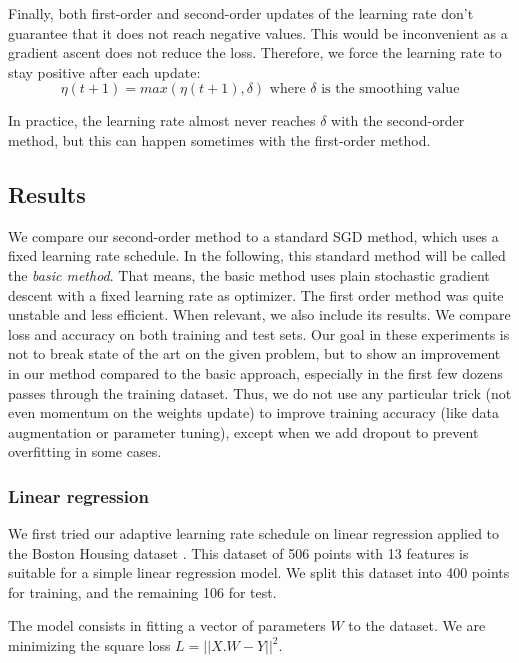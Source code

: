 \documentclass{article}
\begin{document}
  Finally, both first-order and second-order updates of the learning rate don't guarantee that it does not reach negative values. This would be inconvenient as a gradient ascent does not reduce the loss. Therefore, we force the learning  rate to stay positive after each update:\\
  \begin{equation}
  \eta(t+1) = max(\eta(t+1),\delta) \text{ where $\delta$ is the smoothing value}
  \end{equation}
  
  In practice, the learning rate almost never reaches $\delta$ with the second-order method, but this can happen sometimes with the first-order method. 
  
  \subsection{Results} 
  
  We compare our second-order method to a standard SGD method, which uses a fixed learning rate schedule. In the following, this standard method will be called the \emph{basic method}. That means, the basic method uses plain stochastic gradient descent with a fixed learning rate as optimizer. The first order method was quite unstable and less efficient. When relevant, we also include its results. We compare loss and accuracy on both training and test sets. Our goal in these experiments is not to break state of the art on the given problem, but to show an improvement in our method compared to the basic approach, especially in the first few dozens passes through the training dataset. Thus, we do not use any particular trick (not even momentum on the weights update) to improve training accuracy (like data augmentation or parameter tuning), except when we add dropout to prevent overfitting in some cases.  
  
  \subsubsection{Linear regression}
  
  We first tried our adaptive learning rate schedule on linear regression applied to the Boston Housing dataset \cite{boston}. This dataset of 506 points with 13 features is suitable for a simple linear regression model. We split this dataset into 400 points for training, and the remaining 106 for test.
  
  The model consists in fitting a vector of parameters $W$ to the dataset. We are minimizing the square loss $L=||X.W-Y||^{2}$.
  
\end{document}
